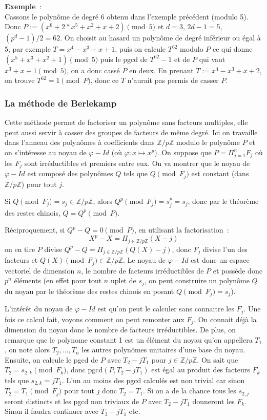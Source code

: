 \documentclass[a4paper,11pt]{article}
\begin{document}
\begin{giacjshere}
{\bf Exemple}~:\\ 
Cassons le polynôme de degré 6 obtenu dans l'exemple précédent
(modulo 5). Donc $P:=(x^6+2*x^5+x^2+x+2) \pmod 5$ et $d=3$, $2d-1=5$,
$(p^{d}-1)/2=62$.
On choisit au hasard un polynôme de degré inférieur ou égal à 5, par exemple
$T=x^4-x^3+x+1$, puis on calcule $T^{62}$ modulo $P$ ce qui donne
$(x^5+x^3+x^2+1) \pmod 5$ puis le pgcd de $T^{62}-1$ et de $P$
qui vaut $x^3+x+1 \pmod 5$, on a donc cassé $P$ en deux. 
En prenant $T:=x^4-x^3+x+2$, on trouve $T^{62}=1 \pmod P$, donc
ce $T$ n'aurait pas permis de casser $P$.

\subsubsection{La méthode de Berlekamp}
Cette méthode permet de factoriser un polynôme sans facteurs multiples,
elle peut aussi servir à casser des groupes de facteurs de même degré.
Ici on travaille dans l'anneau des polynômes à coefficients dans $\mathbb{Z}/p\mathbb{Z}$
modulo le polynôme $P$ et on s'intéresse au noyau de $\varphi-Id$
(où $\varphi: x \mapsto x^p$). On
suppose que $P=\Pi_{j=1}^n F_j$ où les $F_j$ sont irréductibles et
premiers entre eux. On va montrer que le noyau de $\varphi-Id$ est
composé des polynômes $Q$ tels que $Q \pmod {F_j}$ est constant
(dans $\mathbb{Z}/p\mathbb{Z}$) pour tout $j$.

Si $Q \pmod {F_j}=s_j \in \mathbb{Z}/p\mathbb{Z}$, alors $Q^p \pmod {F_j}=s_j^p=s_j$, donc
par le théorème des restes chinois, $Q=Q^p \pmod P$. 

Réciproquement, si
$Q^p-Q=0 \pmod P$, en utilisant la factorisation~:
\[ X^p-X= \Pi_{j \in \mathbb{Z}/p\mathbb{Z} } (X-j)\]
on en tire $P$ divise $Q^p-Q=\Pi_{j \in \mathbb{Z}/p\mathbb{Z} } (Q(X)-j)$,
donc $F_j$ divise l'un des facteurs et $Q(X) \pmod {F_j} \in \mathbb{Z}/p\mathbb{Z}$.
Le noyau de $\varphi -Id$
est donc un espace vectoriel de dimension $n$, le nombre
de facteurs irréductibles de $P$ et possède donc $p^n$ éléments
(en effet pour tout $n$ uplet de $s_j$, on peut construire un polynôme
$Q$ du noyau par le théorème des restes chinois en posant $Q\pmod {F_j}=s_j$).

L'intérêt du noyau de $\varphi-Id$ est qu'on peut le calculer sans connaitre
les $F_j$. Une fois ce calcul fait, voyons comment on peut remonter 
aux $F_j$. On connait déjà la dimension du noyau donc le nombre de facteurs
irréductibles. De plus, on remarque que le polynome constant 1 est un
élément du noyau qu'on appellera $T_1$, on note alors $T_2,...,T_n$ les
autres polynômes unitaires d'une base du noyau. 
Ensuite, on calcule le pgcd de $P$ avec $T_2-jT_1$
pour $j\in \mathbb{Z}/p\mathbb{Z}$. On sait que $T_2=s_{2,k} \pmod {F_k}$, donc pgcd$(P,T_2-jT_1)$
est égal au produit des facteurs $F_k$ tels que $s_{2,k}=jT_1$. L'un au moins
des pgcd calculés est non trivial car sinon $T_2=T_1 \pmod{F_j}$ pour
tout $j$ donc $T_2=T_1$. Si on a de la chance tous les $s_{2,j}$ seront
distincts et les pgcd non triviaux de $P$ avec $T_2-jT_1$ donneront les $F_k$.
Sinon il faudra continuer avec $T_3-jT_1$ etc.


\end{giacjshere}
\end{document}
